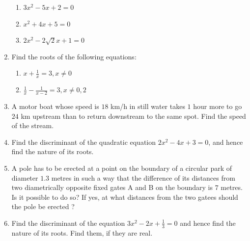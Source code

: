 \documentclass{article}
\theoremstyle{remark}
\begin{document}
\begin{enumerate}
\begin{enumerate}[label=(\roman*)]
\item $3x^2-5x+2 = 0$
\item $x^2+4x+5 = 0$
\item $2x^2-2\sqrt 2x+1 = 0$
\end{enumerate}
\item Find the roots of the following equations:
\begin{enumerate}[label=(\roman*)]
\item $x+\frac{1}{x} = 3,x\neq0$
\item $\frac{1}{x}-\frac{1}{x-2} = 3, x\neq 0,2$
\end{enumerate}
\item A motor boat whose speed is $18$ km/h in still water takes $1$ hour more to go $24$ km upstream than to return downstream to the same spot. Find the speed of the stream.
\item Find the discriminant of the quadratic equation $2x^2-4x+3 = 0$, and hence find the nature of its roots.
\item A pole has to be erected at a point on the boundary of a circular park of diameter $1.3$ metres in such a way that the difference of its distances from two diametrically opposite fixed gates A and B on the boundary is $7$ metres. Is it possible to do so? If yes, at what distances from the two gatees should the pole be erected ?
\item Find the discriminant of the equation $3x^2-2x+\frac{1}{3} = 0$ and hence find the nature of its roots. Find them, if they are real.
\end{enumerate}
\end{document}

